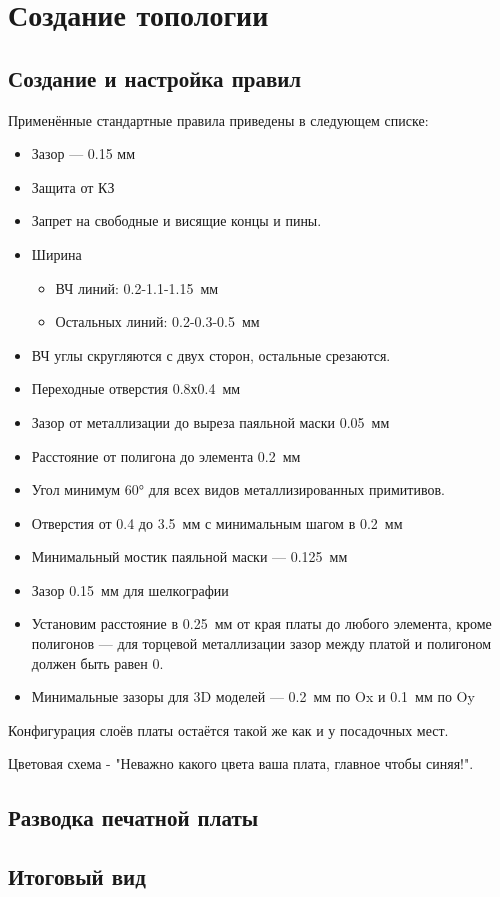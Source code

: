 \chapter{Создание топологии} \label{chap:altium-PcbDoc}


\section{Создание и настройка правил}

Применённые стандартные правила приведены в следующем списке:
\begin{itemize}
	\item Зазор --- 0.15 мм
	\item Защита от КЗ
	\item Запрет на свободные и висящие концы и пины.
	\item Ширина
		\begin{itemize}
			\item ВЧ линий: 0.2-1.1-1.15~мм
			\item Остальных линий: 0.2-0.3-0.5~мм
		\end{itemize}
	\item ВЧ углы скругляются с двух сторон, остальные срезаются.
	\item Переходные отверстия 0.8х0.4~мм
	\item Зазор  от металлизации  до  выреза паяльной маски 0.05~мм
	\item Расстояние от полигона до элемента 0.2~мм
	\item Угол минимум  60°  для  всех видов металлизированных примитивов. 
	\item Отверстия от 0.4 до 3.5~мм с минимальным шагом в 0.2~мм
	\item Минимальный мостик паяльной маски --- 0.125~мм
	\item Зазор 0.15~мм для шелкографии
	\item Установим расстояние в 0.25~мм от края платы до любого элемента, кроме полигонов --- для торцевой металлизации зазор между платой и полигоном должен быть равен 0.
	\item Минимальные зазоры для 3D моделей --- 0.2~мм по Ox и 0.1~мм по Oy
\end{itemize}

Конфигурация слоёв платы остаётся такой же как и у посадочных мест.

Цветовая схема - "Неважно какого цвета ваша плата, главное чтобы синяя!".

\section{Разводка печатной платы}


\section{Итоговый вид}


